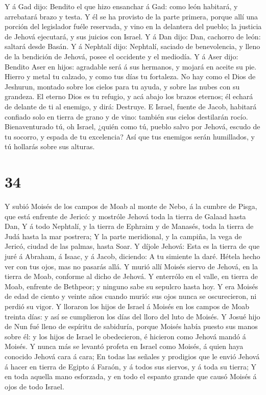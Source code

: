  Y á Gad dijo: Bendito el que hizo ensanchar á Gad: como
león habitará, y arrebatará brazo y testa.  Y él se ha
provisto de la parte primera, porque allí una porción del legislador
fuéle reservada, y vino en la delantera del pueblo; la justicia de
Jehová ejecutará, y sus juicios con Israel.  Y á Dan dijo:
Dan, cachorro de león: saltará desde Basán.  Y á Nephtalí
dijo: Nephtalí, saciado de benevolencia, y lleno de la bendición de
Jehová, posee el occidente y el mediodía.  Y á Aser dijo:
Bendito Aser en hijos: agradable será á sus hermanos, y mojará en aceite
su pie.  Hierro y metal tu calzado, y como tus días tu
fortaleza.  No hay como el Dios de Jeshurun, montado sobre
los cielos para tu ayuda, y sobre las nubes con su grandeza.
 El eterno Dios es tu refugio, y acá abajo los brazos
eternos; él echará de delante de ti al enemigo, y dirá: Destruye.
 E Israel, fuente de Jacob, habitará confiado solo en
tierra de grano y de vino: también sus cielos destilarán rocío.
 Bienaventurado tú, oh Israel, ¿quién como tú, pueblo salvo
por Jehová, escudo de tu socorro, y espada de tu excelencia? Así que tus
enemigos serán humillados, y tú hollarás sobre sus alturas.

\hypertarget{section-33}{%
\section{34}\label{section-33}}

 Y subió Moisés de los campos de Moab al monte de Nebo, á la
cumbre de Pisga, que está enfrente de Jericó: y mostróle Jehová toda la
tierra de Galaad hasta Dan,  Y á todo Nephtalí, y la tierra
de Ephraim y de Manasés, toda la tierra de Judá hasta la mar postrera;
 Y la parte meridional, y la campiña, la vega de Jericó,
ciudad de las palmas, hasta Soar.  Y díjole Jehová: Esta es
la tierra de que juré á Abraham, á Isaac, y á Jacob, diciendo: A tu
simiente la daré. Hétela hecho ver con tus ojos, mas no pasarás allá.
 Y murió allí Moisés siervo de Jehová, en la tierra de Moab,
conforme al dicho de Jehová.  Y enterrólo en el valle, en
tierra de Moab, enfrente de Bethpeor; y ninguno sabe su sepulcro hasta
hoy.  Y era Moisés de edad de ciento y veinte años cuando
murió: sus ojos nunca se oscurecieron, ni perdió su vigor. 
Y lloraron los hijos de Israel á Moisés en los campos de Moab treinta
días: y así se cumplieron los días del lloro del luto de Moisés.
 Y Josué hijo de Nun fué lleno de espíritu de sabiduría,
porque Moisés había puesto sus manos sobre él: y los hijos de Israel le
obedecieron, é hicieron como Jehová mandó á Moisés.  Y
nunca más se levantó profeta en Israel como Moisés, á quien haya
conocido Jehová cara á cara;  En todas las señales y
prodigios que le envió Jehová á hacer en tierra de Egipto á Faraón, y á
todos sus siervos, y á toda su tierra;  Y en toda aquella
mano esforzada, y en todo el espanto grande que causó Moisés á ojos de
todo Israel.
